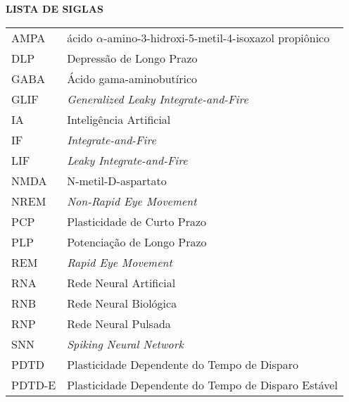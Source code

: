 \begin{center}
\textbf{LISTA DE SIGLAS}
\end{center}
\vspace*{0.5cm}
\begin{tabular}{ll}
AMPA & ácido $\alpha$-amino-3-hidroxi-5-metil-4-isoxazol propiônico \\
DLP & Depressão de Longo Prazo \\
GABA & Ácido gama-aminobutírico \\
GLIF & \textit{Generalized Leaky Integrate-and-Fire} \\
IA & Inteligência Artificial \\
IF & \textit{Integrate-and-Fire} \\
LIF & \textit{Leaky Integrate-and-Fire} \\
NMDA & N-metil-D-aspartato \\
NREM & \textit{Non-Rapid Eye Movement} \\
PCP & Plasticidade de Curto Prazo \\
PLP & Potenciação de Longo Prazo \\
REM & \textit{Rapid Eye Movement} \\
RNA & Rede Neural Artificial \\
RNB & Rede Neural Biológica \\
RNP & Rede Neural Pulsada \\
SNN & \textit{Spiking Neural Network} \\
PDTD & Plasticidade Dependente do Tempo de Disparo \\
PDTD-E & Plasticidade Dependente do Tempo de Disparo Estável \\

\end{tabular}
\addtocounter{table}{0}